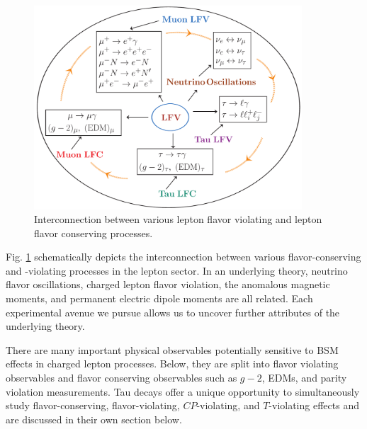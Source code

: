 \begin{figure}[t!]
\begin{center}
\includegraphics[width=10cm]{ChargedLeptons/Figures/chart.pdf}
\caption{\label{CL:chart}Interconnection between various lepton flavor violating and  lepton flavor conserving processes.}
\end{center}
\end{figure}

Fig. \ref{CL:chart} schematically depicts the interconnection between
various flavor-conserving and -violating processes in the lepton
sector.  In an underlying theory, neutrino flavor oscillations,
charged lepton flavor violation,  the anomalous magnetic moments, and permanent electric
dipole moments are all related.  Each experimental avenue we pursue allows us to uncover further attributes of the underlying theory. 

There are many important physical observables potentially sensitive to
BSM effects in charged lepton processes. Below, they are  split into  flavor violating observables and flavor conserving observables  such as $g-2$, EDMs, and parity violation measurements. Tau decays offer a unique opportunity to simultaneously study flavor-conserving, flavor-violating, $C\!P$-violating,  and $T$-violating effects and are discussed in
 their own section below.